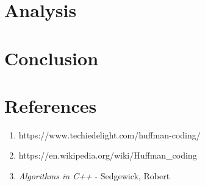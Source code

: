 \documentclass[a4paper, 12pt]{article}
\begin{document}
\section{Analysis}


\section{Conclusion}

\section{References}
	\begin{enumerate}
		\item https://www.techiedelight.com/huffman-coding/
		\item https://en.wikipedia.org/wiki/Huffman\_coding
		\item \textit{Algorithms in C++} -  Sedgewick, Robert
	\end{enumerate}
\end{document}
